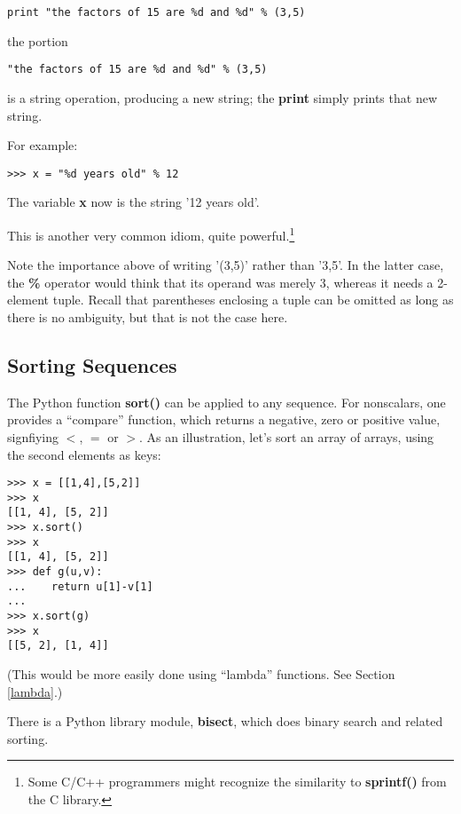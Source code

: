\begin{Verbatim}[fontsize=\relsize{-2}]
print "the factors of 15 are %d and %d" % (3,5) 
\end{Verbatim}

the portion

\begin{Verbatim}[fontsize=\relsize{-2}]
"the factors of 15 are %d and %d" % (3,5) 
\end{Verbatim}

is a string operation, producing a new string; the {\bf print} simply
prints that new string.  

For example:

\begin{Verbatim}[fontsize=\relsize{-2}]
>>> x = "%d years old" % 12
\end{Verbatim}

The variable {\bf x} now is the string '12 years old'.

This is another very common idiom, quite powerful.\footnote{Some C/C++
programmers might recognize the similarity to {\bf sprintf()} from the C
library.}

Note the importance above of writing '(3,5)' rather than '3,5'.  In the
latter case, the {\bf \%} operator would think that its operand was
merely 3, whereas it needs a 2-element tuple.  Recall that parentheses
enclosing a tuple can be omitted as long as there is no ambiguity, but
that is not the case here.

\subsection{Sorting Sequences}
\label{sorting}

The Python function {\bf sort()} can be applied to any sequence.  For
nonscalars, one provides a ``compare'' function, which returns a
negative, zero or positive value, signfiying $<$, $=$ or $>$.  As an
illustration, let's sort an array of arrays, using the second elements
as keys:

\begin{Verbatim}[fontsize=\relsize{-2}]
>>> x = [[1,4],[5,2]]
>>> x
[[1, 4], [5, 2]]
>>> x.sort()
>>> x
[[1, 4], [5, 2]]
>>> def g(u,v):
...    return u[1]-v[1]
...
>>> x.sort(g)
>>> x
[[5, 2], [1, 4]]
\end{Verbatim}

(This would be more easily done using ``lambda'' functions.  See
Section \ref{lambda}.)

There is a Python library module, {\bf bisect}, which does binary search
and related sorting.

